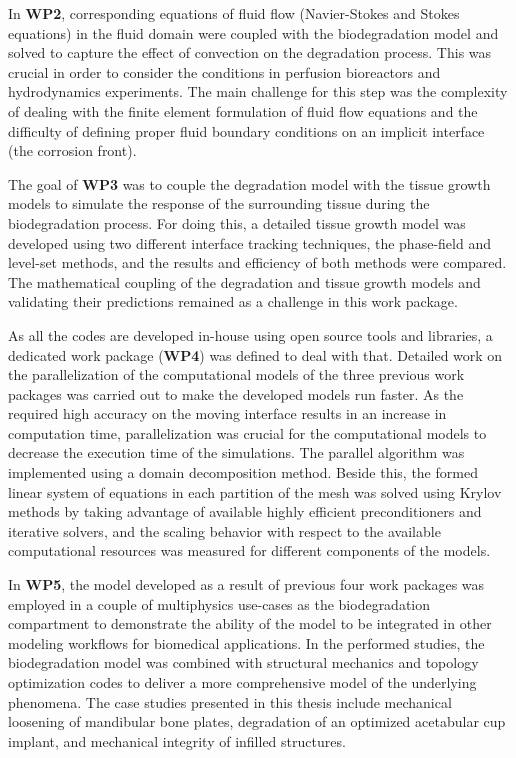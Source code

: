 In \textbf{WP2}, corresponding equations of fluid flow (Navier-Stokes and Stokes equations) in the fluid domain were coupled with the biodegradation model and solved to capture the effect of convection on the degradation process. This was crucial in order to consider the conditions in perfusion bioreactors and hydrodynamics experiments. The main challenge for this step was the complexity of dealing with the finite element formulation of fluid flow equations and the difficulty of defining proper fluid boundary conditions on an implicit interface (the corrosion front).

The goal of \textbf{WP3} was to couple the degradation model with the tissue growth models to simulate the response of the surrounding tissue during the biodegradation process. For doing this, a detailed tissue growth model was developed using two different interface tracking techniques, the phase-field and level-set methods, and the results and efficiency of both methods were compared. The mathematical coupling of the degradation and tissue growth models and validating their predictions remained as a challenge in this work package.

As all the codes are developed in-house using open source tools and libraries, a dedicated work package (\textbf{WP4}) was defined to deal with that. Detailed work on the parallelization of the computational models of the three previous work packages was carried out to make the developed models run faster. As the required high accuracy on the moving interface results in an increase in computation time, parallelization was crucial for the computational models to decrease the execution time of the simulations. The parallel algorithm was implemented using a domain decomposition method. Beside this, the formed linear system of equations in each partition of the mesh was solved using Krylov methods by taking advantage of available highly efficient preconditioners and iterative solvers, and the scaling behavior with respect to the available computational resources was measured for different components of the models.

In \textbf{WP5}, the model developed as a result of previous four work packages was employed in a couple of multiphysics use-cases as the biodegradation compartment to demonstrate the ability of the model to be integrated in other modeling workflows for  biomedical applications. In the performed studies, the biodegradation model was combined with structural mechanics and topology optimization codes to deliver a more comprehensive model of the underlying phenomena. The case studies presented in this thesis include mechanical loosening of mandibular bone plates, degradation of an optimized acetabular cup implant, and mechanical integrity of infilled structures. 


